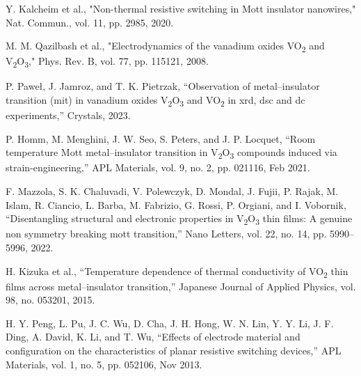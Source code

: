 \documentclass[conference]{IEEEtran}
\begin{document}
\begin{thebibliography}{00}
	 Y. Kalcheim et al., "Non-thermal resistive switching in Mott insulator nanowires," Nat. Commun., vol. 11, pp. 2985, 2020.

	 M. M. Qazilbash et al., "Electrodynamics of the vanadium oxides VO\textsubscript{2} and V\textsubscript{2}O\textsubscript{3}," Phys. Rev. B, vol. 77, pp. 115121, 2008.

	 P. Paweł, J. Jamroz, and T. K. Pietrzak, “Observation of metal–insulator transition (mit) in vanadium oxides V\textsubscript{2}O\textsubscript{3} and VO\textsubscript{2} in xrd, dsc and dc experiments,” Crystals, 2023.

	 P. Homm, M. Menghini, J. W. Seo, S. Peters, and J. P. Locquet, “Room temperature Mott metal–insulator transition in V\textsubscript{2}O\textsubscript{3} compounds induced via strain-engineering,” APL Materials, vol. 9, no. 2, pp. 021116, Feb  2021.

	 F. Mazzola, S. K. Chaluvadi, V. Polewczyk, D. Mondal, J. Fujii, P. Rajak, M. Islam, R. Ciancio, L. Barba, M. Fabrizio, G. Rossi, P. Orgiani, and I. Vobornik, “Disentangling structural and electronic properties in V\textsubscript{2}O\textsubscript{3} thin films: A genuine non symmetry breaking mott transition,” Nano Letters, vol. 22, no. 14, pp. 5990–5996, 2022.

	 H. Kizuka et al., “Temperature dependence of thermal conductivity of VO\textsubscript{2} thin films across metal–insulator transition,” Japanese Journal of Applied Physics, vol. 98, no. 053201, 2015.

	 H. Y. Peng, L. Pu, J. C. Wu, D. Cha, J. H. Hong, W. N. Lin, Y. Y. Li, J. F. Ding, A. David, K. Li, and T. Wu, “Effects of electrode material and configuration on the characteristics of planar resistive switching devices,” APL Materials, vol. 1, no. 5, pp. 052106, Nov  2013.
\end{thebibliography}
\end{document}
